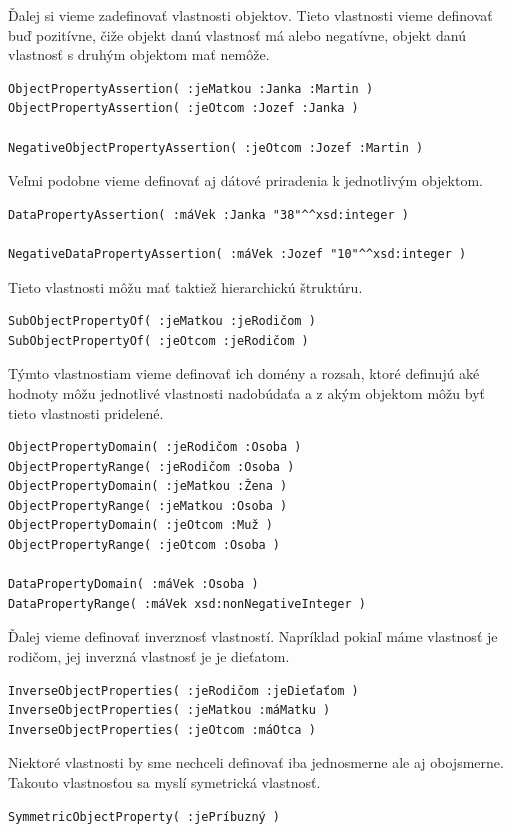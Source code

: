 \documentclass[12pt, a4paper, oneside]{book}
\begin{document}
Ďalej si vieme zadefinovať vlastnosti objektov. Tieto vlastnosti vieme definovať buď pozitívne, čiže objekt danú vlastnosť má alebo negatívne, objekt danú vlastnosť s druhým objektom mať nemôže.
\begin{verbatim}
ObjectPropertyAssertion( :jeMatkou :Janka :Martin )
ObjectPropertyAssertion( :jeOtcom :Jozef :Janka )

NegativeObjectPropertyAssertion( :jeOtcom :Jozef :Martin )
\end{verbatim}


Veľmi podobne vieme definovať aj dátové priradenia k jednotlivým objektom.
\begin{verbatim}
DataPropertyAssertion( :máVek :Janka "38"^^xsd:integer )

NegativeDataPropertyAssertion( :máVek :Jozef "10"^^xsd:integer )
\end{verbatim}


Tieto vlastnosti môžu mať taktiež hierarchickú štruktúru.
\begin{verbatim}
SubObjectPropertyOf( :jeMatkou :jeRodičom )
SubObjectPropertyOf( :jeOtcom :jeRodičom )
\end{verbatim}


Týmto vlastnostiam vieme definovať ich domény a rozsah, ktoré definujú aké hodnoty môžu jednotlivé vlastnosti nadobúdaťa a z akým objektom môžu byť tieto vlastnosti pridelené.
\begin{verbatim}
ObjectPropertyDomain( :jeRodičom :Osoba )
ObjectPropertyRange( :jeRodičom :Osoba )
ObjectPropertyDomain( :jeMatkou :Žena )
ObjectPropertyRange( :jeMatkou :Osoba )
ObjectPropertyDomain( :jeOtcom :Muž )
ObjectPropertyRange( :jeOtcom :Osoba )

DataPropertyDomain( :máVek :Osoba ) 
DataPropertyRange( :máVek xsd:nonNegativeInteger ) 
\end{verbatim}


Ďalej vieme definovať inverznosť vlastností. Napríklad pokiaľ máme vlastnosť je rodičom, jej inverzná vlastnosť je je dieťatom.
\begin{verbatim}
InverseObjectProperties( :jeRodičom :jeDieťaťom )
InverseObjectProperties( :jeMatkou :máMatku )
InverseObjectProperties( :jeOtcom :máOtca )
\end{verbatim}


Niektoré vlastnosti by sme nechceli definovať iba jednosmerne ale aj obojsmerne. Takouto vlastnosťou sa myslí symetrická vlastnosť.
\begin{verbatim}
SymmetricObjectProperty( :jePríbuzný )
\end{verbatim}
\end{document}
